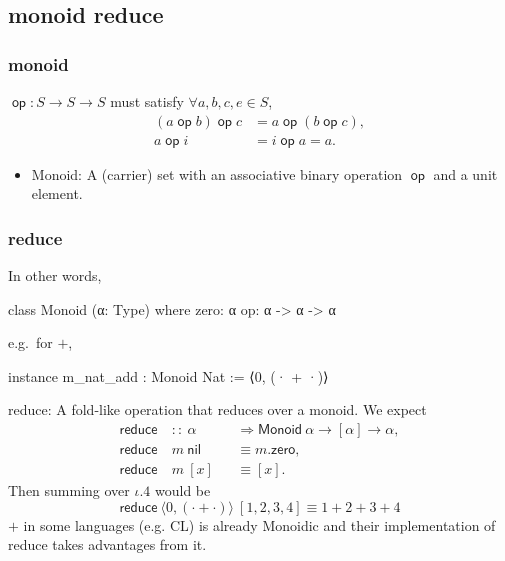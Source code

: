 \documentclass{beamer}
\DeclareMathOperator{\op}{\mathsf{op}}
\begin{document}
\subsection{monoid reduce}
\begin{frame}
    \frametitle{monoid}
    $\op: S\to S\to S$ must satisfy $\forall a,b,c,e\in S$,
    \begin{align*}
        (a \op b) \op c & = a \op (b \op c) \tag*{Associativity}, \\
        a \op i         & = i \op a = a \tag*{Identity}.
    \end{align*}
    \begin{itemize}
        \item \textsf{Monoid}: A (carrier) set with an associative binary operation $\op$ and a unit element.
    \end{itemize}

\end{frame}
\begin{frame}[fragile]
    \frametitle{reduce}
    In other words,

    \begin{leancode}
        class Monoid (α: Type) where
            zero: α
            op: α -> α -> α
    \end{leancode}

    e.g.\ for $+$,

    \begin{leancode}
        instance m_nat_add : Monoid Nat := ⟨0, (· + ·)⟩
    \end{leancode}

    \textsf{reduce}: A fold-like operation that reduces over a monoid. We expect
    \begin{align*}
        \mathsf{reduce} & \ ::\ \alpha      &  & \Rightarrow \textsf{Monoid}\ \alpha \to [\alpha] \to \alpha, \\
        \mathsf{reduce} & \ m\ \mathsf{nil} &  & \equiv m.\mathsf{zero},                                      \\
        \mathsf{reduce} & \ m\ [x]          &  & \equiv [x].
    \end{align*}
    Then summing over $\iota.4$ would be
    \begin{equation*}
        \mathsf{reduce}\ \langle 0,(\cdot + \cdot)\rangle\ [1,2,3,4] \equiv 1 + 2 + 3 + 4
    \end{equation*}
    $+$ in some languages (e.g. CL) is already Monoidic and their implementation of reduce takes advantages from it.
\end{frame}
\end{document}
